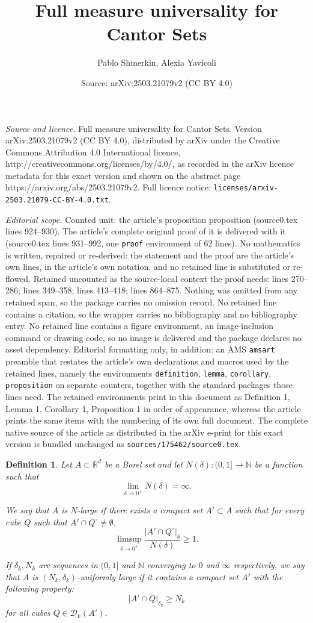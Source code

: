\documentclass[10pt,a4paper]{amsart}
\title{Full measure universality for Cantor Sets}
\author{Pablo Shmerkin, Alexia Yavicoli}
\date{Source: arXiv:2503.21079v2 (CC BY 4.0)}
\newtheorem{definition}{Definition}
\def\N{{\mathbb{N}}}
\def\R{{\mathbb{R}}}
\begin{document}
\maketitle

\noindent\emph{Source and licence.} Full measure universality for Cantor Sets. Version arXiv:2503.21079v2 (CC BY 4.0), distributed by arXiv under the Creative Commons Attribution 4.0 International licence, http://creativecommons.org/licenses/by/4.0/, as recorded in the arXiv licence metadata for this exact version and shown on the abstract page https://arxiv.org/abs/2503.21079v2. Full licence notice: \texttt{licenses/arxiv-2503.21079-CC-BY-4.0.txt}.\par\smallskip

\noindent\textit{Editorial scope.} Counted unit: the article's proposition proposition (source0.tex lines 924--930). The article's complete original proof of it is delivered with it (source0.tex lines 931--992, one \texttt{proof} environment of 62 lines). No mathematics is written, repaired or re-derived: the statement and the proof are the article's own lines, in the article's own notation, and no retained line is substituted or re-flowed.  Retained uncounted as the source-local context the proof needs: lines 270--286; lines 349--358; lines 413--418; lines 864--875.  Nothing was omitted from any retained span, so the package carries no omission record.  No retained line contains a citation, so the wrapper carries no bibliography and no bibliography entry.  No retained line contains a figure environment, an image-inclusion command or drawing code, so no image is delivered and the package declares no asset dependency.  Editorial formatting only, in addition: an AMS \texttt{amsart} preamble that restates the article's own declarations and macros used by the retained lines, namely the environments \texttt{definition}, \texttt{lemma}, \texttt{corollary}, \texttt{proposition} on separate counters, together with the standard packages those lines need.  The retained environments print in this document as Definition 1, Lemma 1, Corollary 1, Proposition 1 in order of appearance, whereas the article prints the same items with the numbering of its own full document.  The complete native source of the article as distributed in the arXiv e-print for this exact version is bundled unchanged as \texttt{sources/175462/source0.tex}.
\begin{definition} \label{def:large-set}
    Let $A\subset\R^d$ be a Borel set and let $N(\delta):(0,1]\to\N$ be a function such that
    \[
        \lim_{\delta\to 0^{+}} N(\delta) = \infty.
    \]

    We say that $A$ is \emph{$N$-large} if there exists a compact set $A'\subset A$ such that for every cube $Q$ such that $A'\cap Q^{\circ}\neq\emptyset$,
    \[
       \limsup_{\delta\to 0^{+}} \frac{|A'\cap Q^{\circ}|_{\delta}}{N(\delta)} \ge 1.
    \]

    If $\delta_k, N_k$ are sequences in $(0,1]$ and $\N$ converging to $0$ and $\infty$ respectively, we say that $A$ is \emph{$(N_k,\delta_k)$-uniformly large} if it contains a compact set $A'$ with the following property:
    \[
        |A'\cap Q|_{\delta_k} \ge N_k
    \]
    for all cubes $Q\in\mathcal{D}_k(A')$.
\end{definition}
\end{document}
